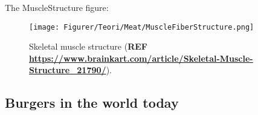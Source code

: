 
The MuscleStructure figure:
\begin{figure}
    \centering
    \texttt{[image: Figurer/Teori/Meat/MuscleFiberStructure.png]}
    \caption{Skeletal muscle structure (\textbf{REF \url{https://www.brainkart.com/article/Skeletal-Muscle-Structure_21790/}}).}
    \label{fig:Teori:Meat:SkeletalMuscleStructure}
\end{figure}

\subsection{Burgers in the world today}

\begin{table}[H]
    \caption{Ingredients of some vegetarian burgers found in the market today.}
    \centering
\end{table}
